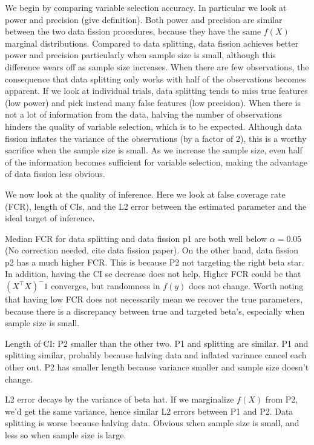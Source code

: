 We begin by comparing variable selection accuracy. In particular we look at power and precision (give definition). Both power and precision are similar between the two data fission procedures, because they have the same $f(X)$ marginal distributions. Compared to data splitting, data fission achieves better power and precision particularly when sample size is small, although this difference wears off as sample size increases. When there are few observations, the consequence that data splitting only works with half of the observations becomes apparent. If we look at individual trials, data splitting tends to miss true features (low power) and pick instead many false features (low precision). When there is not a lot of information from the data, halving the number of observations hinders the quality of variable selection, which is to be expected. Although data fission inflates the variance of the observations (by a factor of 2), this is a worthy sacrifice when the sample size is small. As we increase the sample size, even half of the information becomes sufficient for variable selection, making the advantage of data fission less obvious.

We now look at the quality of inference. Here we look at false coverage rate (FCR), length of CIs, and the L2 error between the estimated parameter and the ideal target of inference.

Median FCR for data splitting and data fission p1 are both well below $\alpha = 0.05$ (No correction needed, cite data fission paper). On the other hand, data fission p2 has a much higher FCR. This is because P2 not targeting the right beta star. In addition, having the CI se decrease does not help. Higher FCR could be that $(X^\top X)^-1$ converges, but randomness in $f(y)$ does not change. Worth noting that having low FCR does not necessarily mean we recover the true parameters, because there is a discrepancy between true and targeted beta's, especially when sample size is small.

Length of CI: P2 smaller than the other two. P1 and splitting are similar. P1 and splitting similar, probably because halving data and inflated variance cancel each other out. P2 has smaller length because variance smaller and sample size doesn't change.

L2 error decays by the variance of beta hat. If we marginalize $f(X)$ from P2, we'd get the same variance, hence similar L2 errors between P1 and P2. Data splitting is worse because halving data. Obvious when sample size is small, and less so when sample size is large.

